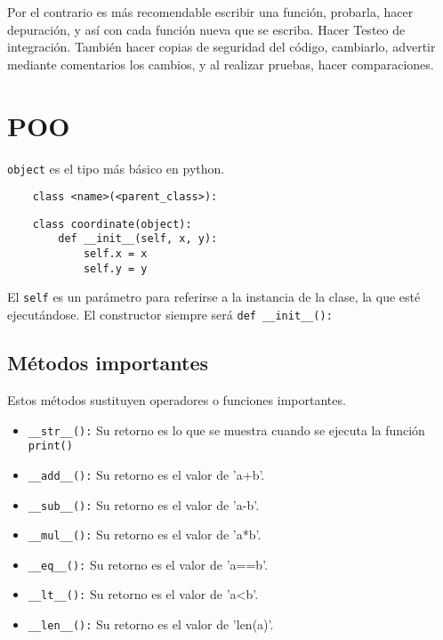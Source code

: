 Por el contrario es más recomendable escribir una función, probarla, hacer depuración, y así con cada función nueva que se escriba. Hacer Testeo de integración. 
También hacer copias de seguridad del código, cambiarlo, advertir mediante comentarios los cambios, y al realizar pruebas, hacer comparaciones.













\section{POO}

\texttt{object} es el tipo más básico en python.

\begin{verbatim}
    class <name>(<parent_class>):
\end{verbatim}

\begin{verbatim}
    class coordinate(object):
        def __init__(self, x, y):
            self.x = x
            self.y = y
\end{verbatim}

El \texttt{self} es un parámetro para referirse a la instancia de la clase, la que esté ejecutándose. El constructor siempre será \texttt{def \_\_init\_\_():}\\

\subsection{Métodos importantes}

Estos métodos sustituyen operadores o funciones importantes.

\begin{itemize}
    \item \texttt{\_\_str\_\_():} Su retorno es lo que se muestra cuando se ejecuta la función \texttt{print()}
    \item \texttt{\_\_add\_\_():} Su retorno es el valor de 'a+b'.
    \item \texttt{\_\_sub\_\_():} Su retorno es el valor de 'a-b'.
    \item \texttt{\_\_mul\_\_():} Su retorno es el valor de 'a*b'.
    \item \texttt{\_\_eq\_\_():} Su retorno es el valor de 'a==b'.
    \item \texttt{\_\_lt\_\_():} Su retorno es el valor de 'a<b'.
    \item \texttt{\_\_len\_\_():} Su retorno es el valor de 'len(a)'.
\end{itemize}

